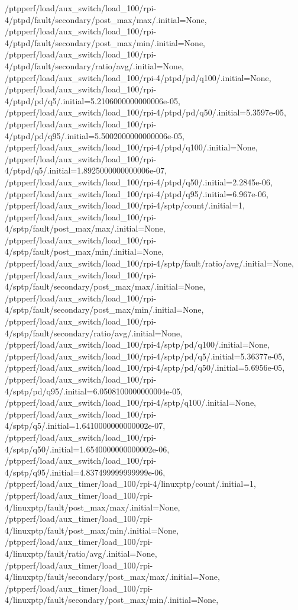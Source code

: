 {    /ptpperf/load/aux_switch/load_100/rpi-4/ptpd/fault/secondary/post_max/max/.initial=None,
    /ptpperf/load/aux_switch/load_100/rpi-4/ptpd/fault/secondary/post_max/min/.initial=None,
    /ptpperf/load/aux_switch/load_100/rpi-4/ptpd/fault/secondary/ratio/avg/.initial=None,
    /ptpperf/load/aux_switch/load_100/rpi-4/ptpd/pd/q100/.initial=None,
    /ptpperf/load/aux_switch/load_100/rpi-4/ptpd/pd/q5/.initial=5.2106000000000006e-05,
    /ptpperf/load/aux_switch/load_100/rpi-4/ptpd/pd/q50/.initial=5.3597e-05,
    /ptpperf/load/aux_switch/load_100/rpi-4/ptpd/pd/q95/.initial=5.5002000000000006e-05,
    /ptpperf/load/aux_switch/load_100/rpi-4/ptpd/q100/.initial=None,
    /ptpperf/load/aux_switch/load_100/rpi-4/ptpd/q5/.initial=1.8925000000000006e-07,
    /ptpperf/load/aux_switch/load_100/rpi-4/ptpd/q50/.initial=2.2845e-06,
    /ptpperf/load/aux_switch/load_100/rpi-4/ptpd/q95/.initial=6.967e-06,
    /ptpperf/load/aux_switch/load_100/rpi-4/sptp/count/.initial=1,
    /ptpperf/load/aux_switch/load_100/rpi-4/sptp/fault/post_max/max/.initial=None,
    /ptpperf/load/aux_switch/load_100/rpi-4/sptp/fault/post_max/min/.initial=None,
    /ptpperf/load/aux_switch/load_100/rpi-4/sptp/fault/ratio/avg/.initial=None,
    /ptpperf/load/aux_switch/load_100/rpi-4/sptp/fault/secondary/post_max/max/.initial=None,
    /ptpperf/load/aux_switch/load_100/rpi-4/sptp/fault/secondary/post_max/min/.initial=None,
    /ptpperf/load/aux_switch/load_100/rpi-4/sptp/fault/secondary/ratio/avg/.initial=None,
    /ptpperf/load/aux_switch/load_100/rpi-4/sptp/pd/q100/.initial=None,
    /ptpperf/load/aux_switch/load_100/rpi-4/sptp/pd/q5/.initial=5.36377e-05,
    /ptpperf/load/aux_switch/load_100/rpi-4/sptp/pd/q50/.initial=5.6956e-05,
    /ptpperf/load/aux_switch/load_100/rpi-4/sptp/pd/q95/.initial=6.0508100000000004e-05,
    /ptpperf/load/aux_switch/load_100/rpi-4/sptp/q100/.initial=None,
    /ptpperf/load/aux_switch/load_100/rpi-4/sptp/q5/.initial=1.6410000000000002e-07,
    /ptpperf/load/aux_switch/load_100/rpi-4/sptp/q50/.initial=1.6540000000000002e-06,
    /ptpperf/load/aux_switch/load_100/rpi-4/sptp/q95/.initial=4.837499999999999e-06,
    /ptpperf/load/aux_timer/load_100/rpi-4/linuxptp/count/.initial=1,
    /ptpperf/load/aux_timer/load_100/rpi-4/linuxptp/fault/post_max/max/.initial=None,
    /ptpperf/load/aux_timer/load_100/rpi-4/linuxptp/fault/post_max/min/.initial=None,
    /ptpperf/load/aux_timer/load_100/rpi-4/linuxptp/fault/ratio/avg/.initial=None,
    /ptpperf/load/aux_timer/load_100/rpi-4/linuxptp/fault/secondary/post_max/max/.initial=None,
    /ptpperf/load/aux_timer/load_100/rpi-4/linuxptp/fault/secondary/post_max/min/.initial=None,
}

